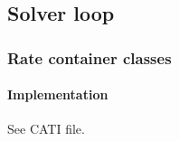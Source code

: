 \subsection{Solver loop}

\subsubsection{Rate container classes}

\paragraph{Implementation} See CATI file.
